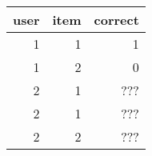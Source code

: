 \begin{tabular}{rrr}
\toprule
 user &  item &  correct \\
\midrule
    1 &     1 &        1 \\
    1 &     2 &        0 \\
    2 &     1 &        ??? \\
    2 &     1 &        ??? \\
    2 &     2 &        ??? \\
\bottomrule
\end{tabular}
